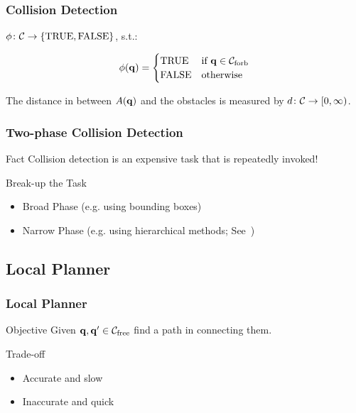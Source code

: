 \documentclass{beamer}
\begin{document}
\begin{frame}
  \frametitle{Collision Detection}
  \begin{definition}[Predicate]
    \begin{center}
      \(\phi \colon \mathcal{C} \to \{\mathrm{TRUE,FALSE}\}\), s.t.:%
    \end{center}
    \[%
    \phi(\cp{q}) =
    \begin{cases}
      \mathrm{TRUE} & \text{if } \cp{q} \in \cforb\\
      \mathrm{FALSE} & \text{otherwise}
    \end{cases}
    \]%
  \end{definition}

  \begin{definition}
    The distance in \wspace{} between \(\robot(\cp{q})\) and the obstacles is measured by \(d \colon \mathcal{C} \to [0,\infty)\).
  \end{definition}
\end{frame}

\begin{frame}
  \frametitle{Two-phase Collision Detection}
  \begin{alertblock}{Fact}
    Collision detection is an expensive task that is repeatedly invoked!
  \end{alertblock}
  \begin{block}{Break-up the Task}
    \begin{itemize}
    \item Broad Phase (e.g. using bounding boxes)
    \item Narrow Phase (e.g. using hierarchical methods; See~\cite[\S~5.3.2]{La06})
    \end{itemize}
  \end{block}
\end{frame}

\subsection*{Local Planner}

\begin{frame}
  \frametitle{Local Planner}

  \begin{block}{Objective}
    Given \(\cp{q},\cp{q}' \in \cfree\) find a path in \cfree{} connecting them.
  \end{block}

  \begin{block}{Trade-off}
    \begin{itemize}
    \item Accurate and slow
    \item\alert<2->{Inaccurate and quick}
    \end{itemize}
  \end{block}
\end{frame}
\end{document}
